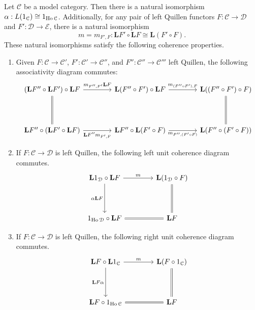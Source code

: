 \begin{theorem}\label{3.2.6}
	Let $\mathcal{C} $ be a model category. Then there is a natural isomorphism $\alpha : L(1_\mathcal{C} ) \cong 1_{\operatorname{Ho} \mathcal{C} } $. Additionally, for any pair of left Quillen functors $F : \mathcal{C}  \to \mathcal{D} $ and $F': \mathcal{D}  \to \mathcal{E} $, there is a natural isomorphism
	\[
		m=m_{F',F} : \mathbf{L} F'\circ \mathbf{L} F\cong \mathbf{L} (F'\circ F)
	.\]
	These natural isomorphisms satisfy the following coherence properties.
	\begin{enumerate}
		\item Given $F : \mathcal{C}  \to \mathcal{C} '$, $F': \mathcal{C} ' \to \mathcal{C}''$, and $F'': \mathcal{C} '' \to \mathcal{C} '''$ left Quillen, the following associativity diagram commutes:
			\[\begin{tikzcd}[row sep = 4em, column sep = 4em]
				(\mathbf{L} F''\circ \mathbf{L} F')\circ \mathbf{L} F \ar[" m_{F''\text{,} F'}\mathbf{L} F ", r]  \ar[equals, d] & \mathbf{L} (F''\circ F')\circ \mathbf{L} F \ar[" m_{(F''\circ F')\text{,} F}  ", r]  & \mathbf{L} ((F''\circ F')\circ F)\ar[equals, d]  \\
			\mathbf{L} F''\circ (\mathbf{L} F'\circ \mathbf{L} F)\ar[" \mathbf{L} F'' m_{F'\text{,} F}  "', r]  & \mathbf{L} F''\circ \mathbf{L} (F'\circ F)\ar[" m_{F''\text{,} (F'\circ F)}  "', r]  & \mathbf{L} (F''\circ (F'\circ F))
			\end{tikzcd}\]
		\item If $F : \mathcal{C}  \to \mathcal{D} $ is left Quillen, the following left unit coherence diagram commutes.
			\[\begin{tikzcd}[row sep = 4em, column sep = 4em]
			\mathbf{L} 1_\mathcal{D}\circ \mathbf{L} F\ar[" m ", r] \ar[" \alpha \mathbf{L} F"', d]   & \mathbf{L} (1_\mathcal{D} \circ F) \ar[equals, d]  \\
			1_{\Ho \mathcal{D} } \circ \mathbf{L} F \ar[equals, r]  & \mathbf{L} F
			\end{tikzcd}\]
		\item If $F : \mathcal{C}  \to \mathcal{D} $ is left Quillen, the following right unit coherence diagram commutes.
			\[\begin{tikzcd}[row sep = 4em, column sep = 4em]
			\mathbf{L} F\circ \mathbf{L} 1_{\mathcal{C} } \ar[" m ", r] \ar[" \mathbf{L} F\alpha "', d]  & \mathbf{L} (F\circ 1_{\mathcal{C} } )\ar[equals, d]  \\
			\mathbf{L} F\circ 1_{\Ho \mathcal{C} } \ar[equals, r]  & \mathbf{L} F
			\end{tikzcd}\]
	\end{enumerate}
\end{theorem}

